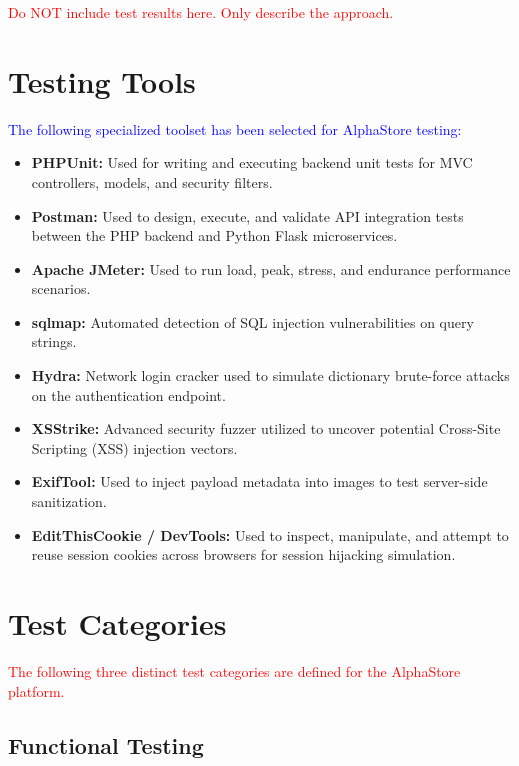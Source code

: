 \documentclass[12pt,a4paper]{article}
\newcommand{\student}[1]{\textcolor{blue}{#1}} %
\newcommand{\important}[1]{\textcolor{red}{#1}} %
\begin{document}
\important{Do NOT include test results here. Only describe the approach.}

\section{Testing Tools}

\student{The following specialized toolset has been selected for AlphaStore testing:}

\begin{itemize}
\item \textbf{PHPUnit:} Used for writing and executing backend unit tests for MVC controllers, models, and security filters.
\item \textbf{Postman:} Used to design, execute, and validate API integration tests between the PHP backend and Python Flask microservices.
\item \textbf{Apache JMeter:} Used to run load, peak, stress, and endurance performance scenarios.
\item \textbf{sqlmap:} Automated detection of SQL injection vulnerabilities on query strings.
\item \textbf{Hydra:} Network login cracker used to simulate dictionary brute-force attacks on the authentication endpoint.
\item \textbf{XSStrike:} Advanced security fuzzer utilized to uncover potential Cross-Site Scripting (XSS) injection vectors.
\item \textbf{ExifTool:} Used to inject payload metadata into images to test server-side sanitization.
\item \textbf{EditThisCookie / DevTools:} Used to inspect, manipulate, and attempt to reuse session cookies across browsers for session hijacking simulation.
\end{itemize}

\newpage

\section{Test Categories}

\important{The following three distinct test categories are defined for the AlphaStore platform.}

\subsection{Functional Testing}
\end{document}
